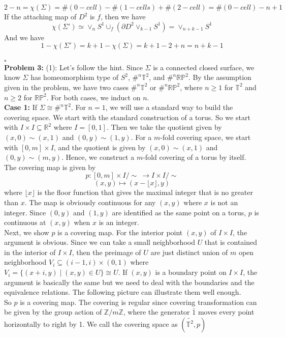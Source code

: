 \documentclass[12pt]{amsart}
\newcommand{\R}{\mathbb{R}}
\newcommand{\Z}{\mathbb{Z}}
\newcommand{\torus}{\mathbb{T}^2}
\newcommand{\rp}{\mathbb{RP}^2}
\begin{document}
\[2-n=\chi(\Sigma)=\#(0-cell)-\#(1-cells)+\#(2-cell)=\#(0-cell)-n+1\]
If the attaching map of $D^2$ is $f$, then we have 
\[\chi(\Sigma')\simeq \vee_{n}S^1\cup_f (\partial D^2\vee_{k-1}S^1)=\vee_{n+k-1}S^1\]
And we have 
\[1-\chi(\Sigma')=k+1-\chi(\Sigma)=k+1-2+n=n+k-1\]
\\\phantom{qed}\hfill$\square$\\
\textbf{Problem 3:}
(1): Let's follow the hint. Since $\Sigma$ is a connected closed surface, we know $\Sigma$ has homeomorphism type of $S^2$, $\#^n \torus$, and $\#^n \rp$. By the assumption given in the problem, we have two cases $\#^n\torus$ or $\#^n\rp$, where $n\geq 1$ for $\torus $ and $n\geq 2$ for $\rp$. For both cases, we induct on $n$.\\
\textbf{Case 1:} If $\Sigma\cong \#^n\torus$. For $n=1$, we will use a standard way to build the covering space. We start with the standard construction of a torus. So we start with $I\times I\subseteq \R^2$ where $I=[0,1]$. Then we take the quotient given by $(x,0)\sim(x,1)$ and $(0,y)\sim(1,y)$. For a $m$-fold covering space, we start with $[0,m]\times I $, and the quotient is given by $(x,0)\sim(x,1)$ and $(0,y)\sim(m,y)$. Hence, we construct a $m$-fold covering of a torus by itself. The covering map is given by 
\[p:[0,m]\times I/\sim\  \to I\times I/\sim\]
\[ (x,y)\mapsto (x-\lfloor x \rfloor,y) \]
where $\lfloor x\rfloor$ is the floor function that gives the maximal integer that is no greater than $x$. The map is obviously continuous for any $(x,y)$ where $x$ is not an integer. Since $(0,y)$ and $(1,y)$ are identified as the same point on a torus, $p$ is continuous at $(x,y)$ when $x$ is an integer.\\
Next, we show $p$ is a covering map. For the interior point $(x,y)$ of $I\times I$, the argument is obvious. Since we can take a small neighborhood $U$ that is contained in the interior of $I\times I$, then the preimage of $U$ are just distinct union of $m$ open neighborhood $V_i\subseteq (i-1,i)\times (0,1)$ where $V_i=\{(x+i,y)\mid (x,y)\in U\}\cong U$. If $(x,y)$ is a boundary point on $I \times I$, the argument is basically the same but we need to deal with the boundaries and the equivalence relations. The following picture can illustrate them well enough.\\
So $p$ is a covering map. The covering is regular since covering transformation can be given by the group action of $\Z/m\Z$, where the generator $\bar{1}$ moves every point horizontally to right by 1. We call the covering space as $(\tilde{\torus},p)$\\
\end{document}
